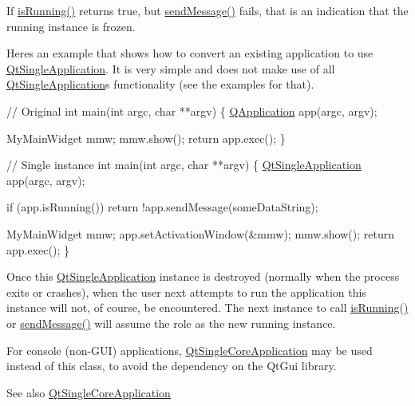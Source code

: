 If \hyperlink{class_qt_single_application_aa9f0e6e4f18ac79bbb7a955cd860894d}{is\+Running()} returns true, but \hyperlink{class_qt_single_application_a0e2f3900f0290913c738ec6b4b959922}{send\+Message()} fails, that is an indication that the running instance is frozen.

Here\textquotesingle{}s an example that shows how to convert an existing application to use \hyperlink{class_qt_single_application}{Qt\+Single\+Application}. It is very simple and does not make use of all \hyperlink{class_qt_single_application}{Qt\+Single\+Application}\textquotesingle{}s functionality (see the examples for that).


\begin{DoxyCode}
\textcolor{comment}{// Original}
\textcolor{keywordtype}{int} main(\textcolor{keywordtype}{int} argc, \textcolor{keywordtype}{char} **argv)
\{
    \hyperlink{class_q_application}{QApplication} app(argc, argv);

    MyMainWidget mmw;
    mmw.show();
    \textcolor{keywordflow}{return} app.exec();
\}

\textcolor{comment}{// Single instance}
\textcolor{keywordtype}{int} main(\textcolor{keywordtype}{int} argc, \textcolor{keywordtype}{char} **argv)
\{
    \hyperlink{class_qt_single_application}{QtSingleApplication} app(argc, argv);

    \textcolor{keywordflow}{if} (app.isRunning())
        \textcolor{keywordflow}{return} !app.sendMessage(someDataString);

    MyMainWidget mmw;
    app.setActivationWindow(&mmw);
    mmw.show();
    \textcolor{keywordflow}{return} app.exec();
\}
\end{DoxyCode}


Once this \hyperlink{class_qt_single_application}{Qt\+Single\+Application} instance is destroyed (normally when the process exits or crashes), when the user next attempts to run the application this instance will not, of course, be encountered. The next instance to call \hyperlink{class_qt_single_application_aa9f0e6e4f18ac79bbb7a955cd860894d}{is\+Running()} or \hyperlink{class_qt_single_application_a0e2f3900f0290913c738ec6b4b959922}{send\+Message()} will assume the role as the new running instance.

For console (non-\/\+G\+UI) applications, \hyperlink{class_qt_single_core_application}{Qt\+Single\+Core\+Application} may be used instead of this class, to avoid the dependency on the Qt\+Gui library.

\begin{DoxySeeAlso}{See also}
\hyperlink{class_qt_single_core_application}{Qt\+Single\+Core\+Application} 
\end{DoxySeeAlso}


